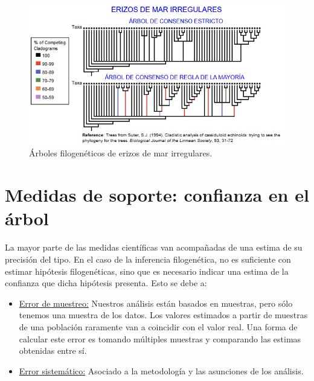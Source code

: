 \begin{figure}[htbp]
\centering
\includegraphics[width=0.7\linewidth]{figs/arbol-erizos.png}
\caption{Árboles filogenéticos de erizos de mar irregulares.}
\end{figure}

\section{Medidas de soporte: confianza en el árbol}
La mayor parte de las medidas científicas van acompañadas de una estima de su precisión del tipo. En el caso de la inferencia filogenética, no es suficiente con estimar hipótesis filogenéticas, sino que es necesario indicar una estima de la confianza que dicha hipótesis presenta. Esto se debe a: 
\begin{itemize}
\item \underline{Error de muestreo:} Nuestros análisis están basados en muestras, pero sólo tenemos una muestra de los datos. Los valores estimados a partir de muestras de una población raramente van a coincidir con el valor real. Una forma de calcular este error es tomando múltiples muestras y comparando las estimas obtenidas entre sí.
\item \underline{Error sistemático:} Asociado a la metodología y las asunciones de los análisis.
\end{itemize}

